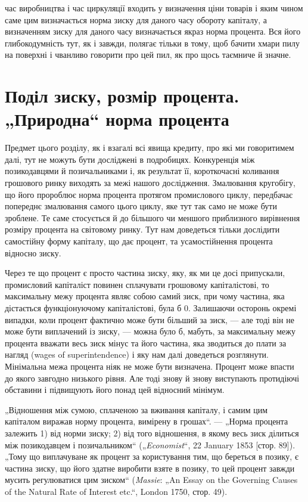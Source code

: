 \parcont{}  %
час виробництва і час циркуляції входить у визначення ціни
товарів і яким чином саме цим визначається норма зиску для
даного часу обороту капіталу, а визначенням зиску для даного
часу визначається якраз норма процента. Вся його глибокодумність
тут, як і завжди, полягає тільки в тому, щоб бачити хмари
пилу на поверхні і чванливо говорити про цей пил, як про щось
таємниче й значне.

\section{Поділ зиску, розмір процента. „Природна“ норма
процента}

Предмет цього розділу, як і взагалі всі явища кредиту, про
які ми говоритимем далі, тут не можуть бути досліджені в подробицях.
Конкуренція між позикодавцями й позичальниками і,
як результат її, короткочасні коливання грошового ринку виходять
за межі нашого дослідження. Змалювання кругобігу, що
його пророблює норма процента протягом промислового циклу,
передбачає попереднє змалювання самого цього циклу, яке тут
так само не може бути зроблене. Те саме стосується й до більшого
чи меншого приблизного вирівнення розміру процента
на світовому ринку. Тут нам доведеться тільки дослідити самостійну
форму капіталу, що дає процент, та усамостійнення процента
відносно зиску.

Через те що процент є просто частина зиску, яку, як ми
це досі припускали, промисловий капіталіст повинен сплачувати
грошовому капіталістові, то максимальну межу процента
являє собою самий зиск, при чому частина, яка дістається функціонуючому
капіталістові, була б \deq{} 0. Залишаючи осторонь окремі
випадки, коли процент фактично може бути більший за зиск, —
але тоді він не може бути виплачений із зиску, — можна було б,
мабуть, за максимальну межу процента вважати весь зиск мінус
та його частина, яка зводиться до плати за нагляд (wages
of superintendence) і яку нам далі доведеться розглянути. Мінімальна
межа процента ніяк не може бути визначена. Процент
може впасти до якого завгодно низького рівня. Але тоді знову
й знову виступають протидіючі обставини і підвищують його
понад цей відносний мінімум.

„Відношення між сумою, сплаченою за вживання капіталу,
і самим цим капіталом виражав норму процента, вимірену в
грошах“. — „Норма процента залежить 1) від норми зиску; 2) від
того відношення, в якому весь зиск ділиться між позикодавцем
і позичальником“ („\emph{Economist}“, 22 January 1853 [стор. 89]). „Тому
що виплачуване як процент за користування тим, що береться в
позику, є частина зиску, що його здатне виробити взяте в позику,
то цей процент завжди мусить регулюватися цим зиском“
(\emph{Massie}: „An Essay on the Governing Causes of the Natural Rate of
Interest etc.“, London 1750, стор. 49).

